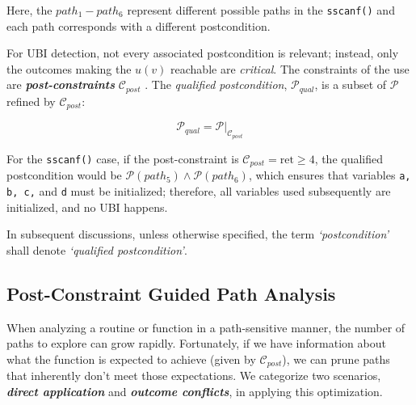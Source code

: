 \noindent
Here, the \(path_1 - path_6\) represent different possible paths in the \texttt{sscanf()} and
each path corresponds with a different postcondition.


For UBI detection, not every associated postcondition is relevant; instead, only the outcomes making the \(u(v)\) reachable are \textit{critical}. The constraints of the use are  \textit{\textbf{post-constraints}} \( \mathcal{C}_{post} \) \cite{path_program_analysis}. The \textit{qualified postcondition}, \( \mathcal{P}_{qual} \), is a subset of \( \mathcal{P} \) refined by \( \mathcal{C}_{post} \):

\[
\mathcal{P}_{qual} = \mathcal{P} |_{\mathcal{C}_{post}}
\]

For the \texttt{sscanf()} case, if the post-constraint is \( \mathcal{C}_{post} = \text{ret} \ge 4 \), the qualified postcondition would be \(\mathcal{P}(path_5) \wedge \mathcal{P}({path_6})\), which ensures that variables \texttt{a, b, c,} and \texttt{d} must be initialized; therefore, all variables used subsequently are initialized, and no UBI happens.

In subsequent discussions, unless otherwise specified, the term \textit{`postcondition'} shall denote \textit{`qualified postcondition'}.


\subsection{Post-Constraint Guided Path Analysis}
\label{subsec:postcondi_work}


When analyzing a routine or function in a path-sensitive manner, the number of paths to explore can grow rapidly. Fortunately, if we have information about what the function is expected to achieve (given by \(\mathcal{C}_{post}\)), we can prune paths that inherently don't meet those expectations. We categorize
two scenarios, \textbf{\textit{direct application}} and \textbf{\textit{outcome conflicts}}, in applying this optimization.




